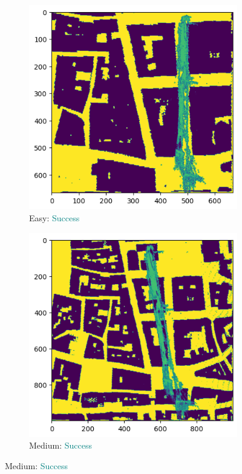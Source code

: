 \documentclass[11pt]{article}
\begin{document}
    \newpage
    \begin{figure}[p]
        \centering
        \begin{subfigure}{0.45\textwidth}
            \centering
            \includegraphics[width=\linewidth]{images/full/easy/5_6_2_easy}
            \caption{Easy: \textcolor{teal}{Success}}
            \label{fig:5_6_2_easy}
        \end{subfigure}
        \hfill
        \begin{subfigure}{0.45\textwidth}
            \centering
            \includegraphics[width=\linewidth]{images/full/medium/5_6_2_medium}
            \caption{Medium: \textcolor{teal}{Success}}
            \label{fig:5_6_2_medium}
        \end{subfigure}


\end{figure}
\end{document}
